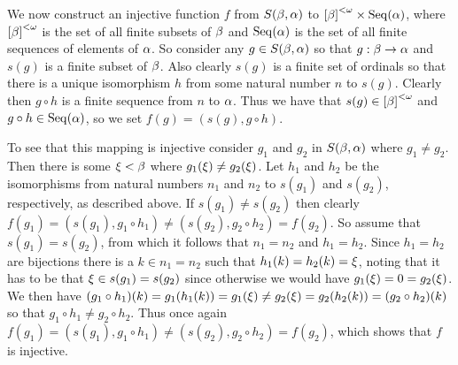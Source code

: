 \begin{solution}
{        We now construct an injective function $f$ from $S(\beta, \alpha)$ to $\left[ \beta \right]^{< \omega} \times \mathrm{Seq}(\alpha)$, where $\left[ \beta \right]^{< \omega}$ is the set of all finite subsets of $\beta$ and $\mathrm{Seq}(\alpha)$ is the set of all finite sequences of elements of $\alpha$.
        So consider any $g \in S(\beta, \alpha)$ so that $g: \beta \to \alpha$ and $s(g)$ is a finite subset of $\beta$.
        Also clearly $s(g)$ is a finite set of ordinals so that there is a unique isomorphism $h$ from some natural number $n$ to $s(g)$.
        Clearly then $g \circ h$ is a finite sequence from $n$ to $\alpha$.
        Thus we have that $s(g) \in \left[ \beta \right]^{< \omega}$ and $g \circ h \in \mathrm{Seq}(\alpha)$, so we set $f(g) = (s(g), g \circ h)$.

        To see that this mapping is injective consider $g_1$ and $g_2$ in $S(\beta, \alpha)$ where $g_1 \neq g_2$.
        Then there is some $\xi < \beta$ where $g_1(\xi) \neq g_2(\xi)$.
        Let $h_1$ and $h_2$ be the isomorphisms from natural numbers $n_1$ and $n_2$ to $s(g_1)$ and $s(g_2)$, respectively, as described above.
        If $s(g_1) \neq s(g_2)$ then clearly $f(g_1) = (s(g_1), g_1 \circ h_1) \neq (s(g_2), g_2 \circ h_2) = f(g_2)$.
        So assume that $s(g_1) = s(g_2)$, from which it follows that $n_1 = n_2$ and $h_1 = h_2$.
        Since $h_1 = h_2$ are bijections there is a $k \in n_1 = n_2$ such that $h_1(k) = h_2(k) = \xi$, noting that it has to be that $\xi \in s(g_1) = s(g_2)$ since otherwise we would have $g_1(\xi) = 0 = g_2(\xi)$.
        We then have $(g_1 \circ h_1)(k) = g_1(h_1(k)) = g_1(\xi) \neq g_2(\xi) = g_2(h_2(k)) = (g_2 \circ h_2)(k)$ so that $g_1 \circ h_1 \neq g_2 \circ h_2$.
        Thus once again $f(g_1) = (s(g_1), g_1 \circ h_1) \neq (s(g_2), g_2 \circ h_2) = f(g_2)$, which shows that $f$ is injective.

}
\end{solution}
